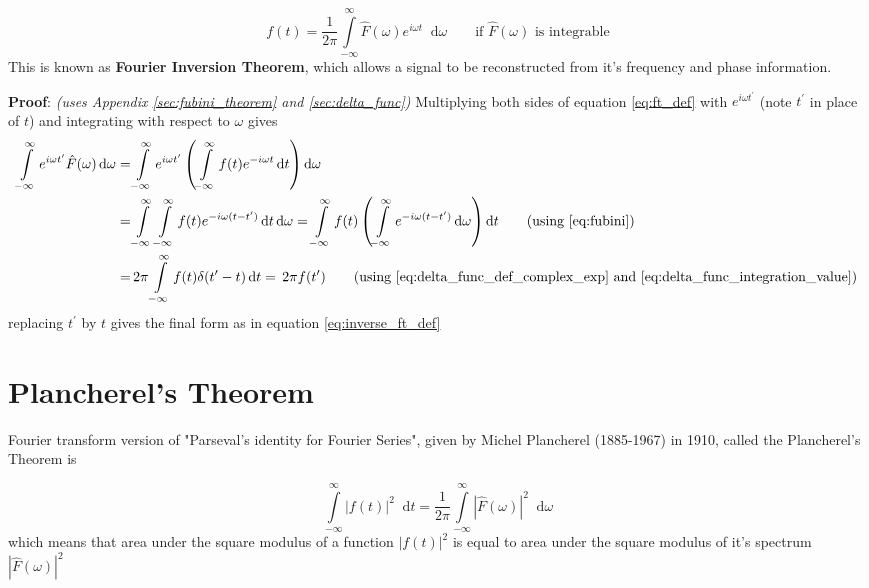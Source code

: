 \documentclass[11pt, a4paper]{article}
\let\oldsection\section
\renewcommand{\section}{%
	\setcounter{equation}{0}%
	\oldsection%
}
\newcommand{\primed}[1]{#1^{\prime}}
\newcommand{\tp}{\primed{t}}	%
\newcommand{\diff}{\mathop{}\!\mathrm{d}}
\newcommand{\dt}{\diff t}
\newcommand{\domega}{\diff \omega}
\newcommand{\dint}[2]{\int \limits_{#1}^{#2}}  %
\newcommand{\intinfty}{\dint{-\infty}{\infty}}	%
\newcommand{\iintinfty}{\intinfty \intinfty}	%
\begin{document}
\begin{equation}\label{eq:inverse_ft_def}
	\boxed{
		f(t) = \frac{1}{2\pi} \intinfty \hat{F}(\omega)e^{i\omega t} \domega
	} \qquad \text{if $\hat{F}(\omega)$ is integrable}
\end{equation}
This is known as \textbf{Fourier Inversion Theorem}, which allows a signal to be reconstructed from it's frequency and phase information.

\vspace{4pt}
\textbf{Proof}: \textit{(uses Appendix \ref{sec:fubini_theorem} and \ref{sec:delta_func})} Multiplying both sides of equation \eqref{eq:ft_def} with $e^{i\omega \tp}$ (note $\tp$ in place of $t$) and integrating with respect to $\omega$ gives 
\begin{align*}
	\intinfty e^{i\omega \tp} \hat{F}(\omega) \domega 
	= & \intinfty e^{i\omega \tp} \left(\intinfty f(t) e^{-i\omega t} \dt \right) \domega \\
	= & \iintinfty f(t) e^{-i\omega (t - \tp)} \dt \domega
	= \intinfty f(t) \left(\intinfty  e^{-i\omega (t - \tp)} \domega \right) \dt \tag{using \eqref{eq:fubini}} \\
	= & \, 2 \pi \intinfty f(t) \delta (\tp - t) \dt = \, 2 \pi f(\tp) \tag{using \eqref{eq:delta_func_def_complex_exp} and \eqref{eq:delta_func_integration_value}}
\end{align*} 
replacing $\tp$ by $t$ gives the final form as in equation \eqref{eq:inverse_ft_def}

\section{Plancherel's Theorem}\label{sec:plancherel_theorem}
Fourier transform version of "Parseval's identity for Fourier Series", given by Michel Plancherel (1885-1967) in 1910, called the Plancherel's Theorem is

\begin{equation}\label{eq:plancherel_theorem}
	\intinfty |f(t)|^{2} \dt = \frac{1}{2 \pi} \intinfty |\hat{F}(\omega)|^{2} \domega
\end{equation}
which means that area under the square modulus of a function $|f(t)|^{2}$ is equal to area under the square modulus of it's spectrum $|\hat{F}(\omega)|^{2}$
\end{document}
